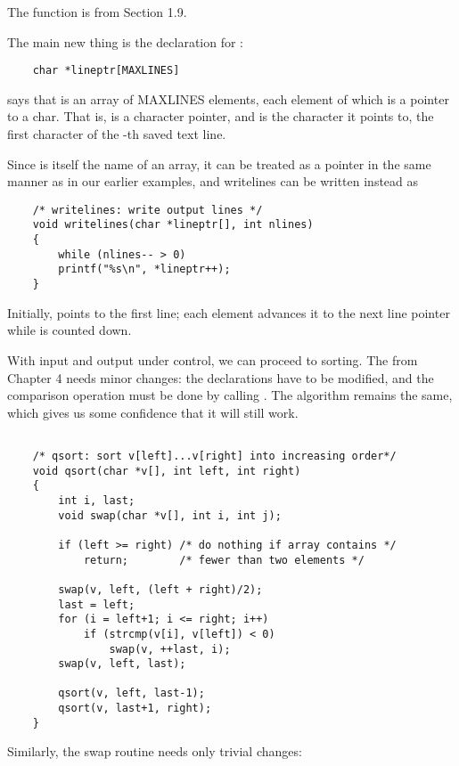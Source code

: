 The function  is from Section 1.9.

The main new thing is the declaration for :
\begin{lstlisting}
    char *lineptr[MAXLINES]
\end{lstlisting}
says that  is an array of MAXLINES elements, each element of which is a pointer to a char.
That is,  is a character pointer, and  is the character it points to, the first character of the -th saved text line.

Since  is itself the name of an array, it can be treated as a pointer in the same manner as in our earlier examples, and writelines can be written instead as
\begin{lstlisting}
    /* writelines: write output lines */
    void writelines(char *lineptr[], int nlines)
    {
        while (nlines-- > 0)
        printf("%s\n", *lineptr++);
    }
\end{lstlisting}
Initially,  points to the first line; each element advances it to the next line pointer while  is counted down.

With input and output under control, we can proceed to sorting.
The  from Chapter 4 needs minor changes: the declarations have to be modified, and the comparison operation must be done by calling .
The algorithm remains the same, which gives us some confidence that it will still work.

\begin{lstlisting}

    /* qsort: sort v[left]...v[right] into increasing order*/
    void qsort(char *v[], int left, int right)
    {
        int i, last;
        void swap(char *v[], int i, int j);

        if (left >= right) /* do nothing if array contains */
            return;        /* fewer than two elements */

        swap(v, left, (left + right)/2);
        last = left;
        for (i = left+1; i <= right; i++)
            if (strcmp(v[i], v[left]) < 0)
                swap(v, ++last, i);
        swap(v, left, last);

        qsort(v, left, last-1);
        qsort(v, last+1, right);
    }

\end{lstlisting}

Similarly, the swap routine needs only trivial changes:

